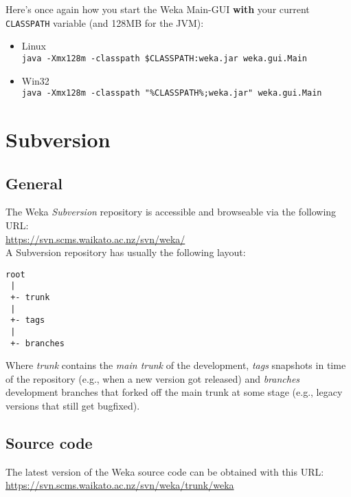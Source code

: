 \noindent Here's once again how you start the Weka Main-GUI \textbf{with} your current \verb=CLASSPATH= variable (and 128MB for the JVM):

\begin{itemize}
\item Linux\\ \verb=java -Xmx128m -classpath $CLASSPATH:weka.jar weka.gui.Main=
\item Win32\\ \verb=java -Xmx128m -classpath "%CLASSPATH%;weka.jar" weka.gui.Main=
\end{itemize}


\section{Subversion}

\subsection{General}
The Weka \textit{Subversion} repository is accessible and browseable via the following URL:\\

\url{https://svn.scms.waikato.ac.nz/svn/weka/}{}\\

\noindent A Subversion repository has usually the following layout:

\begin{verbatim}
root
 |
 +- trunk
 |
 +- tags
 |
 +- branches
\end{verbatim}

\noindent Where \textit{trunk} contains the \textit{main trunk} of the
development, \textit{tags} snapshots in time of the repository (e.g.,
when a new version got released) and \textit{branches} development branches
that forked off the main trunk at some stage (e.g., legacy versions
that still get bugfixed).

\subsection{Source code}
The latest version of the Weka source code can be obtained with this URL:\\

\url{https://svn.scms.waikato.ac.nz/svn/weka/trunk/weka}{}\\

